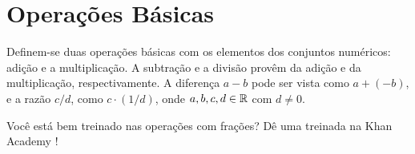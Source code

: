 \section{Operações Básicas}

Definem-se duas operações básicas com os elementos dos conjuntos numéricos: adição e a multiplicação. A subtração e a divisão provêm da adição e da multiplicação, respectivamente. A diferença $a-b$ pode ser vista como $a+(-b)$, e a razão $c/d$, como $c \cdot (1/d)$, onde $a,b,c,d \in \mathbb{R}$ com $d \ne 0$.

Você está bem treinado nas operações com frações? Dê uma treinada na Khan Academy !
